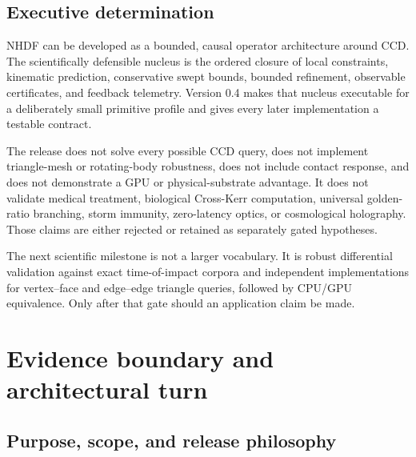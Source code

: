 \documentclass[11pt,a4paper,openany]{book}
\begin{document}
\chapter*{Executive determination}
\begin{decisionbox}
NHDF can be developed as a bounded, causal operator architecture around CCD. The scientifically defensible nucleus is the ordered closure of local constraints, kinematic prediction, conservative swept bounds, bounded refinement, observable certificates, and feedback telemetry. Version 0.4 makes that nucleus executable for a deliberately small primitive profile and gives every later implementation a testable contract.
\end{decisionbox}

\begin{warningbox}
The release does not solve every possible CCD query, does not implement triangle-mesh or rotating-body robustness, does not include contact response, and does not demonstrate a GPU or physical-substrate advantage. It does not validate medical treatment, biological Cross-Kerr computation, universal golden-ratio branching, storm immunity, zero-latency optics, or cosmological holography. Those claims are either rejected or retained as separately gated hypotheses.
\end{warningbox}

\begin{gatebox}
The next scientific milestone is not a larger vocabulary. It is robust differential validation against exact time-of-impact corpora and independent implementations for vertex--face and edge--edge triangle queries, followed by CPU/GPU equivalence. Only after that gate should an application claim be made.
\end{gatebox}

\tableofcontents
\listoffigures
\listoftables

\mainmatter

\part{Evidence boundary and architectural turn}

\chapter{Purpose, scope, and release philosophy}
\end{document}
